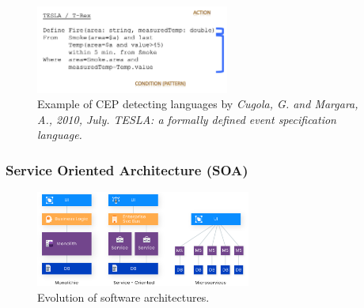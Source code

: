 \documentclass[10pt,a4paper]{article}
\begin{document}
\begin{figure}[ht!]
 \hfill \includegraphics[width=180pt]{images/cep-detecting-languages.png}\hspace*{\fill}
 \caption{Example of CEP detecting languages by \textit{Cugola, G. and Margara, A., 2010, July. TESLA: a formally defined event specification language.}}
\end{figure} 

\subsubsection{Service Oriented Architecture (SOA)}

\begin{figure}[ht!]
 \hfill \includegraphics[width=200pt]{images/soa-vs-monolith-vs-micro.png}\hspace*{\fill}
 \caption{Evolution of software architectures.}
\end{figure} 
\end{document}
